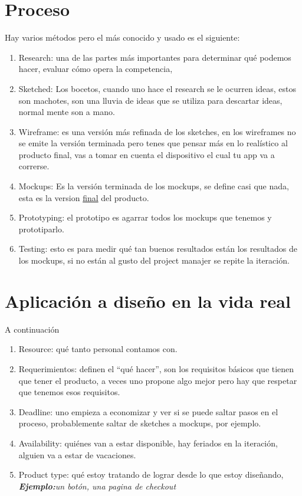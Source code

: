 \section{Proceso}
Hay varios métodos pero el más conocido y usado es el siguiente:
\begin{enumerate}
    \item Research: una de las partes más importantes para determinar qué podemos hacer, evaluar cómo opera la competencia, 
    \item Sketched: Los bocetos, cuando uno hace el research se le ocurren ideas, estos son machotes, son una lluvia de ideas que se utiliza para descartar ideas, normal mente son a mano.
    \item Wireframe: es una versión más refinada de los sketches, en los wireframes no se emite la versión terminada pero tenes que pensar más en lo realístico al producto final, vas a tomar en cuenta el dispositivo el cual tu app va a correrse.
    \item Mockups: Es la versión terminada de los mockups, se define casi que nada, esta es la version \underline{final} del producto.
    \item Prototyping: el prototipo es agarrar todos los mockups que tenemos y prototiparlo.
    \item Testing: esto es para medir qué tan buenos resultados están los resultados de los mockups, si no están al gusto del project manajer se repite la iteración.
\end{enumerate}
\section{Aplicación a diseño en la vida real}
A continuación 
\begin{enumerate}
    \item Resource: qué tanto personal contamos con.
    \item Requerimientos: definen el ``qué hacer'', son los requisitos básicos que tienen que tener el producto, a veces uno propone algo mejor pero hay que respetar que tenemos esos requisitos.
    \item Deadline: uno empieza a economizar y ver si se puede saltar pasos en el proceso, probablemente saltar de sketches a mockups, por ejemplo.
    \item Availability: quiénes van a estar disponible, hay feriados en la iteración, alguien va a estar de vacaciones.
    \item Product type: qué estoy tratando de lograr desde lo que estoy diseñando, \emph{\textbf{Ejemplo:}un botón, una pagina de checkout}
\end{enumerate}

